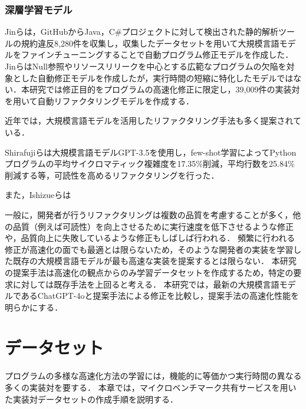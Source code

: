 \documentclass[11pt]{jreport}
\newcommand{\fix}[1]{#1}
\newcommand{\fixtwo}[1]{#1}
\begin{document}


\subsection{深層学習モデル}

\fix{Jinら\cite{Jin_2023}は，GitHubからJava，C\#プロジェクトに対して検出された静的解析ツールの規約違反8,280件を収集し，収集したデータセットを用いて大規模言語モデルをファインチューニングすることで自動プログラム修正モデルを作成した．JinらはNull参照やリソースリリークを中心とする広範なプログラムの欠陥を対象とした自動修正モデルを作成したが，実行時間の短縮に特化したモデルではない．本研究では修正目的をプログラムの高速化修正に限定し，39,009件の実装対を用いて自動リファクタリングモデルを作成する．}

近年では，大規模言語モデルを活用したリファクタリング手法も多く提案されている\cite{Shirafuji_2023, Ishizue_2024}．

\fixtwo{Shirafujiら\cite{Shirafuji_2023}は大規模言語モデルGPT-3.5を使用し，few-shot学習によってPythonプログラムの平均サイクロマティック複雑度を17.35\%削減，平均行数を25.84\%削減する等，可読性を高めるリファクタリングを行った．}

\fixtwo{また，Ishizueら\cite{Ishizue_2024}は}

一般に，開発者が行うリファクタリングは複数の品質を考慮することが多く，他の品質（例えば可読性）を向上させるために実行速度を低下させるような修正や，品質向上に失敗しているような修正もしばしば行われる．
頻繁に行われる修正が高速化の面でも最適とは限らないため，そのような開発者の実装を学習した既存の大規模言語モデルが最も高速な実装を提案するとは限らない．
本研究の提案手法は高速化の観点からのみ学習データセットを作成するため，特定の要求に対しては既存手法を上回ると考える．
本研究では，最新の大規模言語モデルであるChatGPT-4oと提案手法による修正を比較し，提案手法の高速化性能を明らかにする．




\chapter{データセット}\label{chapter:dataset}


プログラムの多様な高速化方法の学習には，機能的に等価かつ実行時間の異なる多くの実装対を要する．
本章では，マイクロベンチマーク共有サービスを用いた実装対データセットの作成手順を説明する．
\end{document}
